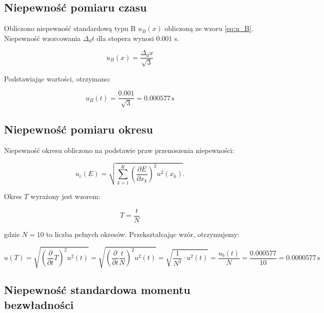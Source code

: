 \documentclass[a4paper,12pt]{article}
\begin{document}
\subsection*{Niepewność pomiaru czasu}

Obliczono niepewność standardową typu B  $u_B(x)$  obliczoną ze wzoru \ref{eq:u_B}. Niepewność wzorcowania $\Delta_d t$ dla stopera wynosi $0.001$ s.


\begin{equation}
    \label{eq:u_B}
    u_B(x) = \frac{\Delta_d x}{\sqrt{3}}
\end{equation}



Podstawiając wartości, otrzymano:



$$
    u_B(t) = \frac{0.001}{\sqrt{3}} = 0.000577\,\text{s}
$$


\subsection*{Niepewność pomiaru okresu}

Niepewność okresu obliczono na podstawie praw przenoszenia niepewności:

\begin{equation}
    \label{eq:niepewnosc_zlozona}
    u_c(E) = \sqrt{\sum_{k=1}^{K} \left( \frac{\partial E}{\partial x_k} \right)^2 u^2(x_k)}.
\end{equation}

Okres $T$ wyrażony jest wzorem:

\[
    T = \frac{t}{N}
\]

gdzie $N=10$ to liczba pełnych okresów. Przekształcając wzór, otrzymujemy:

\[
    u(T) = \sqrt{\left(\frac{\partial}{\partial t} T\right)^2 u^2(t)} = \sqrt{\left(\frac{\partial}{\partial t} \frac{t}{N}\right)^2 u^2(t)} = \sqrt{ \frac{1}{N^2} \cdot u^2(t)} = \frac{u_b(t)}{N} = \frac{0.000577}{10} = 0.0000577\,\text{s}
\]



\subsection*{Niepewność standardowa momentu bezwładności}





\end{document}
